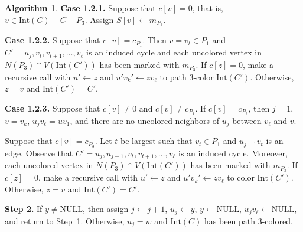 \documentclass[12pt,letterpaper]{article}
\theoremstyle{plain}
\theoremstyle{definition}
\theoremstyle{break}
\newtheorem{algorithm}[lemma]{Algorithm}     %
\begin{document}
\begin{algorithm}
\textbf{Case 1.2.1.} Suppose that $c[v]=0$, that is, $v\in\text{Int}(C)-C-P_3$.
Assign $S[v]\leftarrow m_{P_3}$.

\textbf{Case 1.2.2.} Suppose that $c[v]=c_{P_1}$. Then
$v=v_t\in P_1$ and $C'=u_j,v_t,v_{t+1},\ldots,v_\ell$ is an
induced
cycle and each uncolored vertex in $N(P_3)\cap
V(\text{Int}(C'))$ has been marked with $m_{P_3}$.
If $c[z]=0$, make a recursive call with $u'\leftarrow z$ and
$u'v_k'\leftarrow zv_\ell$ to path $3$-color $\text{Int}(C')$.
Otherwise, $z=v$ and $\text{Int}(C')=C'$.

\textbf{Case 1.2.3.} Suppose that $c[v]\ne 0$ and $c[v]\ne c_{P_1}$.
If $c[v]=c_{P_2}$, then $j=1$, $v=v_k$, $u_jv_\ell=uv_1$, and there are no
uncolored neighbors of $u_j$ between $v_\ell$ and $v$.

Suppose that $c[v]=c_{P_3}$. Let $t$ be largest such that
$v_t\in P_1$ and $u_{j-1}v_{t}$ is an edge. Observe that
$C'=u_j,u_{j-1},v_t,v_{t+1},\ldots,v_\ell$ is an induced cycle. Moreover,
each uncolored vertex in $N(P_3)\cap
V(\text{Int}(C'))$ has been marked with $m_{P_3}$.
If $c[z]=0$, make a recursive call with $u'\leftarrow z$ and
$u'v_k'\leftarrow zv_\ell$ to color $\text{Int}(C')$. Otherwise,
$z=v$ and $\text{Int}(C')=C'$.

\textbf{Step 2.} If $y\ne\text{NULL}$, then 
assign $j\leftarrow j+1$, $u_j\leftarrow y$, $y\leftarrow\text{NULL}$,
$u_jv_\ell\leftarrow\text{NULL}$, and return to Step~1.
Otherwise, $u_j=w$ and $\text{Int}(C)$ has been path
$3$-colored.
\end{algorithm}
\end{document}
